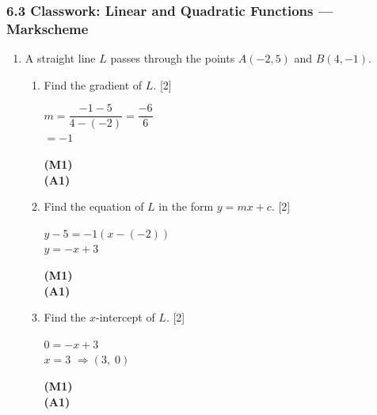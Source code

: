 \documentclass[12pt, twoside]{article}
\begin{document}
\subsubsection*{6.3 Classwork: Linear and Quadratic Functions --- Markscheme}

\begin{enumerate}[itemsep=0.2cm]

\item A straight line $L$ passes through the points $A(-2, 5)$ and $B(4, -1)$.

\begin{enumerate}[itemsep=0.3cm]
  \item Find the gradient of $L$. \hfill [2]

  \begin{minipage}[t]{0.62\textwidth}
  $m = \dfrac{-1 - 5}{4 - (-2)} = \dfrac{-6}{6}$\\[0.15cm]
  $= -1$
  \end{minipage}%
  \begin{minipage}[t]{0.35\textwidth}\raggedleft
  \textbf{(M1)}\\[0.15cm]
  \textbf{(A1)}
  \end{minipage}

  \medskip
  \item Find the equation of $L$ in the form $y = mx + c$. \hfill [2]

  \begin{minipage}[t]{0.62\textwidth}
  $y - 5 = -1(x - (-2))$\\[0.15cm]
  $y = -x + 3$
  \end{minipage}%
  \begin{minipage}[t]{0.35\textwidth}\raggedleft
  \textbf{(M1)}\\[0.15cm]
  \textbf{(A1)}
  \end{minipage}

  \medskip
  \item Find the $x$-intercept of $L$. \hfill [2]

  \begin{minipage}[t]{0.62\textwidth}
  $0 = -x + 3$\\[0.15cm]
  $x = 3$ \quad $\Rightarrow (3,\; 0)$
  \end{minipage}%
  \begin{minipage}[t]{0.35\textwidth}\raggedleft
  \textbf{(M1)}\\[0.15cm]
  \textbf{(A1)}
  \end{minipage}


\end{enumerate}
\end{enumerate}
\end{document}
